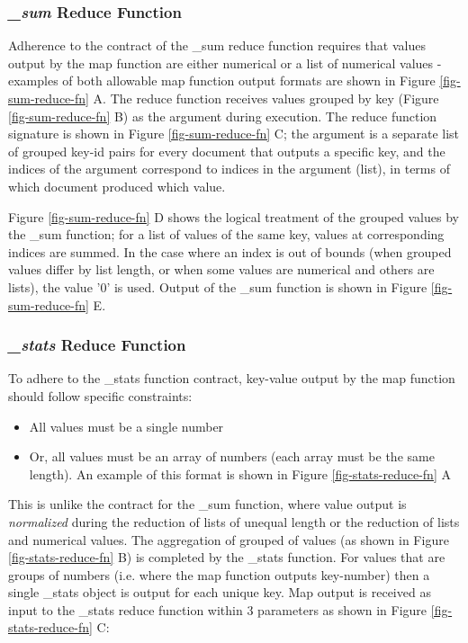 \subsubsection{\textit{\_sum} Reduce Function}
Adherence to the contract of the \_sum reduce function requires that values output by the map function are either numerical or a list of numerical values - examples of both allowable map function output formats are shown in Figure \ref{fig-sum-reduce-fn} A. The reduce function receives values grouped by key (Figure \ref{fig-sum-reduce-fn} B) as the  argument during execution. The reduce function signature is shown in Figure \ref{fig-sum-reduce-fn} C; the  argument is a separate list of grouped key-id pairs for every document that outputs a specific key, and the indices of the  argument correspond to indices in the  argument (list), in terms of which document produced which value.

Figure \ref{fig-sum-reduce-fn} D shows the logical treatment of the grouped values by the \_sum function; for a list of values of the same key, values at corresponding indices are summed. In the case where an index is out of bounds (when grouped values differ by list length, or when some values are numerical and others are lists), the value '0' is used. Output of the \_sum function is shown in Figure \ref{fig-sum-reduce-fn} E.



\subsubsection{\textit{\_stats} Reduce Function}
To adhere to the \_stats function contract, key-value output by the map function should follow specific constraints:

\begin{itemize}
    \item All values must be a single number
    \item Or, all values must be an array of numbers (each array must be the same length). An example of this format is shown in Figure \ref{fig-stats-reduce-fn} A
\end{itemize}

This is unlike the contract for the \_sum function, where value output is \textit{normalized} during the reduction of lists of unequal length or the reduction of lists and numerical values. The aggregation of grouped of values (as shown in Figure \ref{fig-stats-reduce-fn} B) is completed by the \_stats function. For values that are groups of numbers (i.e. where the map function outputs key-number) then a single \_stats object is output for each unique key. Map output is received as input to the \_stats reduce function within 3 parameters as shown in Figure \ref{fig-stats-reduce-fn} C:

